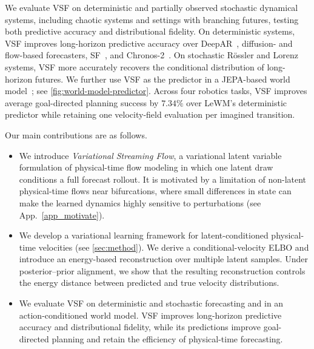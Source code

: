 We evaluate VSF on deterministic and partially observed stochastic dynamical systems, including chaotic systems and settings with branching futures, testing both predictive accuracy and distributional fidelity. On deterministic systems, VSF improves long-horizon predictive accuracy over DeepAR~\citep{salinas2020deepar}, diffusion- and flow-based forecasters, SF~\citep{jiang2025streaming}, and Chronos-2~\citep{ansari2025chronos}. On stochastic R\"ossler and Lorenz systems, VSF more accurately recovers the conditional distribution of long-horizon futures. We further use VSF as the predictor in a JEPA-based world model~\citep{maes2026leworldmodel}; see \cref{fig:world-model-predictor}. Across four robotics tasks, VSF improves average goal-directed planning success by $7.34\%$ over LeWM's deterministic predictor while retaining one velocity-field evaluation per imagined transition.

Our main contributions are as follows.

\begin{itemize}[leftmargin=*]

\item We introduce \emph{Variational Streaming Flow}, a variational latent
variable formulation of physical-time flow modeling in which one latent draw
conditions a full forecast rollout. It is motivated by a limitation of
non-latent physical-time flows near bifurcations, where small differences in
state can make the learned dynamics highly sensitive to perturbations
(see App.~\ref{app_motivate}).

\item We develop a variational learning framework for latent-conditioned
physical-time velocities (see \cref{sec:method}). We derive a
conditional-velocity ELBO and introduce an energy-based reconstruction over
multiple latent samples. Under posterior--prior alignment, we show that the
resulting reconstruction controls the energy distance between predicted and
true velocity distributions.

\item We evaluate VSF on deterministic and stochastic forecasting and in an
action-conditioned world model. VSF improves long-horizon predictive accuracy
and distributional fidelity, while its predictions improve goal-directed
planning and retain the efficiency of physical-time forecasting.

\end{itemize}



